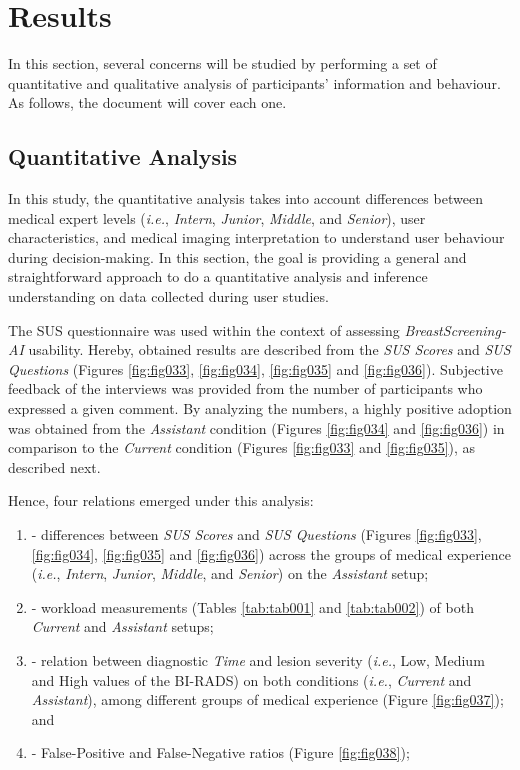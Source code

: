 \section{Results}
\label{sec:sec005006}

In this section, several concerns will be studied by performing a set of quantitative and qualitative analysis of participants' information and behaviour.
As follows, the document will cover each one.

\subsection{Quantitative Analysis}
\label{sec:sec005006001}

In this study, the quantitative analysis takes into account differences between medical expert levels ({\it i.e.}, {\it Intern}, {\it Junior}, {\it Middle}, and {\it Senior}), user characteristics, and medical imaging interpretation to understand user behaviour during decision-making.
In this section, the goal is providing a general and straightforward approach to do a quantitative analysis and inference understanding on data collected during user studies.

The \ac{SUS} questionnaire was used within the context of assessing {\it BreastScreening-AI} usability.
Hereby, obtained results are described from the {\it \ac{SUS} Scores} and {\it \ac{SUS} Questions} (Figures \ref{fig:fig033}, \ref{fig:fig034}, \ref{fig:fig035} and \ref{fig:fig036}).
Subjective feedback of the interviews was provided from the number of participants who expressed a given comment.
By analyzing the numbers, a highly positive adoption was obtained from the {\it Assistant} condition (Figures \ref{fig:fig034} and \ref{fig:fig036}) in comparison to the {\it Current} condition (Figures \ref{fig:fig033} and \ref{fig:fig035}), as described next.

\hfill

\noindent
Hence, four relations emerged under this analysis:

\begin{enumerate}[label=\alph*]
\item - differences between {\it \ac{SUS} Scores} and {\it \ac{SUS} Questions} (Figures \ref{fig:fig033}, \ref{fig:fig034}, \ref{fig:fig035} and \ref{fig:fig036}) across the groups of medical experience ({\it i.e.}, {\it Intern}, {\it Junior}, {\it Middle}, and {\it Senior}) on the {\it Assistant} setup;
\item - workload measurements (Tables \ref{tab:tab001} and \ref{tab:tab002}) of both {\it Current} and {\it Assistant} setups;
\item - relation between diagnostic {\it Time} and lesion severity ({\it i.e.}, Low, Medium and High values of the BI-RADS) on both conditions ({\it i.e.}, {\it Current} and {\it Assistant}), among different groups of medical experience (Figure \ref{fig:fig037}); and
\item - False-Positive and False-Negative ratios (Figure \ref{fig:fig038});
\end{enumerate}

